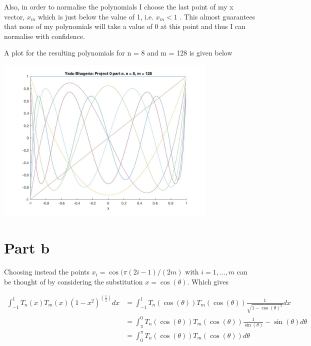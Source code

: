 \documentclass[a4paper,10pt]{article}
\begin{document}
Also, in order to normalise the polynomials I choose the last point of my x vector, $x_m$ which is just below the value of 1, i.e. $x_m < 1$ . This almost guarantees that none of my polynomials will take a value of 0 at this point and thus I can normalise with confidence. 

A plot for the resulting polynomials for n = 8 and m = 128 is given below

\begin{center}
	\includegraphics[width=0.8\textwidth]{fig_a.jpg}
\end{center}

\newpage
\section{Part b}

Choosing instead the points $x_i = \cos(\pi(2i − 1)/(2m)$ with $i=1,\dots,m$ can be thought of by considering the substitution $x = \cos(\theta) $. Which gives 

\begin{equation*}
	\begin{split}
		\int_{-1}^1 T_n(x) T_m(x) (1 - x^2)^(\frac{1}{2}) dx & = \int_{-1}^1 T_n( \cos( \theta)) T_m( \cos( \theta)) \frac{1}{\sqrt{1-\cos(\theta)^2}} dx \\
		& = \int_{\pi}^0 T_n( \cos( \theta)) T_m( \cos( \theta)) \frac{1}{\sin(\theta)} -\sin(\theta) d\theta \\
		& = \int_{0}^\pi T_n( \cos( \theta)) T_m( \cos( \theta)) d\theta \\
	\end{split}
\end{equation*}
\end{document}
